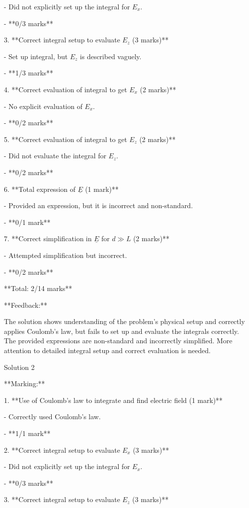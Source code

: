 \documentclass[a4paper,11pt]{article}
\begin{document}
   - Did not explicitly set up the integral for \(E_x\).
   
   - **0/3 marks**

3. **Correct integral setup to evaluate \(E_z\) (3 marks)**

   - Set up integral, but \(E_z\) is described vaguely.
   
   - **1/3 marks**

4. **Correct evaluation of integral to get \(E_x\) (2 marks)**

   - No explicit evaluation of \(E_x\).
   
   - **0/2 marks**

5. **Correct evaluation of integral to get \(E_z\) (2 marks)**

   - Did not evaluate the integral for \(E_z\).
   
   - **0/2 marks**

6. **Total expression of \(\underline{E}\) (1 mark)**

   - Provided an expression, but it is incorrect and non-standard.
   
   - **0/1 mark**

7. **Correct simplification in \(\underline{E}\) for \(d \gg L\) (2 marks)**

   - Attempted simplification but incorrect.
   
   - **0/2 marks**

**Total: 2/14 marks**

**Feedback:** 

The solution shows understanding of the problem's physical setup and correctly applies Coulomb's law, but fails to set up and evaluate the integrals correctly. The provided expressions are non-standard and incorrectly simplified. More attention to detailed integral setup and correct evaluation is needed.

Solution 2

**Marking:**

1. **Use of Coulomb's law to integrate and find electric field (1 mark)**

   - Correctly used Coulomb's law.
   
   - **1/1 mark**

2. **Correct integral setup to evaluate \(E_x\) (3 marks)**

   - Did not explicitly set up the integral for \(E_x\).
   
   - **0/3 marks**

3. **Correct integral setup to evaluate \(E_z\) (3 marks)**
\end{document}
